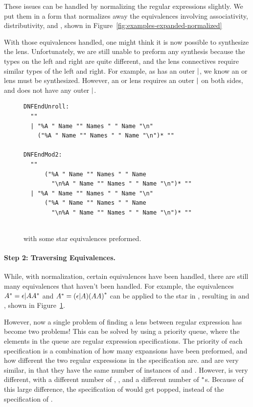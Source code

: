 \documentclass[numbers]{sigplanconf}
\begin{document}
These issues can be handled by normalizing the regular expressions slightly.
We put them in a form that normalizes away the equivalences involving
associativity, distributivity, and \EmptyString{}, shown in
Figure~\ref{fig:examples-expanded-normalized}


With those equivalences handled, one might think it is now possible to
synthesize the lens.
Unfortunately, we are still unable to preform any synthesis because the types
on the left and right are quite different, and the lens connectives require
similar types of the left and right.
For example, as  has an outer $|$, we know an or lens must be
synthesized.
However, an or lens requires an outer $|$ on both sides, and  does
not have any outer $|$.

\begin{figure}
\begin{lstlisting}
DNFEndUnroll:
  ""
  | "%A " Name "" Names " " Name "\n"
    ("%A " Name "" Names " " Name "\n")* ""

DNFEndMod2:
  ""
      ("%A " Name "" Names " " Name
        "\n%A " Name "" Names " " Name "\n")* ""
  | "%A " Name "" Names " " Name "\n"
      ("%A " Name "" Names " " Name
        "\n%A " Name "" Names " " Name "\n")* ""
  
\end{lstlisting}
  \label{fig:examples-star-equivalenced}
  \caption{
     with some star equivalences preformed.
  }
\end{figure}

\paragraph*{Step 2:  Traversing Equivalences.}
While, with normalization, certain equivalences have been handled, there are
still many equivalences that haven't been handled.
For example, the equivalences ${A}^*=\epsilon | A{A}^*$ and
${A}^*=(\epsilon | A){(AA)}^*$ can be applied to the star in
, resulting in  and , shown in
Figure~\ref{fig:examples-star-equivalenced}.

However, now a single problem of finding a lens between regular expression has
become two problems!  This can be solved by using a priority queue, where the
elements in the queue are regular expression specifications.  The priority of
each specification is a combination of how many expansions have been preformed,
and how different the two regular expressions in the specification are.
 and  are very similar, in that they have the same
number of instances of  and .  However,  is
very different, with a different number of , , and a
different number of $^*$s.  Because of this large difference, the
specification of  would get popped, instead of the
specification of .
\end{document}
